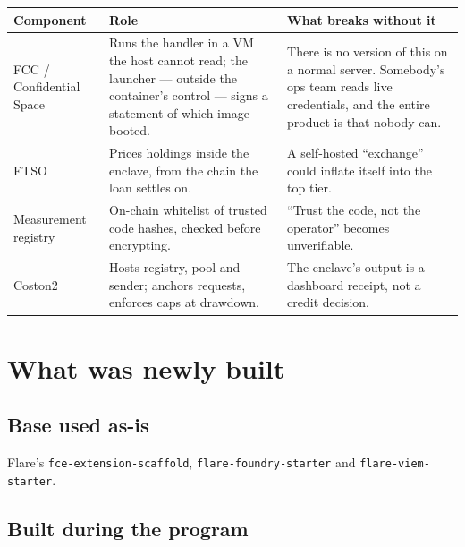 \documentclass[11pt,a4paper]{article}
\newcommand{\code}[1]{\texttt{\small #1}}
\begin{document}
\begin{tabularx}{\textwidth}{@{}l L L@{}}
  \toprule
  \textbf{Component} & \textbf{Role} & \textbf{What breaks without it} \\
  \midrule
  FCC / Confidential Space
    & Runs the handler in a VM the host cannot read; the launcher --- outside
      the container's control --- signs a statement of which image booted.
    & There is no version of this on a normal server. Somebody's ops team reads
      live credentials, and the entire product is that nobody can. \\
  \addlinespace
  FTSO
    & Prices holdings inside the enclave, from the chain the loan settles on.
    & A self-hosted ``exchange'' could inflate itself into the top tier. \\
  \addlinespace
  Measurement registry
    & On-chain whitelist of trusted code hashes, checked before encrypting.
    & ``Trust the code, not the operator'' becomes unverifiable. \\
  \addlinespace
  Coston2
    & Hosts registry, pool and sender; anchors requests, enforces caps at
      drawdown.
    & The enclave's output is a dashboard receipt, not a credit decision. \\
  \bottomrule
\end{tabularx}

\section{What was newly built}

\subsection{Base used as-is}

Flare's \code{fce-extension-scaffold}, \code{flare-foundry-starter} and
\code{flare-viem-starter}.

\subsection{Built during the program}
\end{document}
